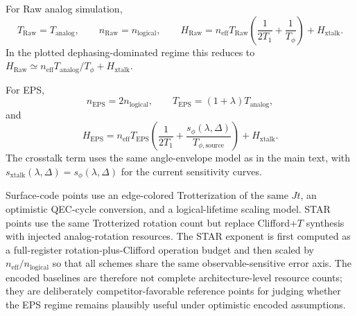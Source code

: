 For Raw analog simulation,
\begin{equation}
T_{\mathrm{Raw}}=T_{\mathrm{analog}},
\qquad
n_{\mathrm{Raw}}=n_{\mathrm{logical}},
\qquad
H_{\mathrm{Raw}}=
n_{\mathrm{eff}}T_{\mathrm{Raw}}
\left(\frac{1}{2T_1}+\frac{1}{T_\phi}\right)
+H_{\mathrm{xtalk}}.
\end{equation}
In the plotted dephasing-dominated regime this reduces to
\(H_{\mathrm{Raw}}\simeq n_{\mathrm{eff}}T_{\mathrm{analog}}/T_\phi
+H_{\mathrm{xtalk}}\).

For EPS,
\begin{equation}
n_{\mathrm{EPS}}=2n_{\mathrm{logical}},
\qquad
T_{\mathrm{EPS}}=(1+\lambda)T_{\mathrm{analog}},
\end{equation}
and
\begin{equation}
H_{\mathrm{EPS}}
=n_{\mathrm{eff}}T_{\mathrm{EPS}}
\left(\frac{1}{2T_1}
+\frac{s_\phi(\lambda,\Delta)}{T_{\phi,\mathrm{source}}}\right)
+H_{\mathrm{xtalk}}.
\end{equation}
The crosstalk term uses the same angle-envelope model as in the main text, with
\(s_{\mathrm{xtalk}}(\lambda,\Delta)=s_\phi(\lambda,\Delta)\) for the current
sensitivity curves.

Surface-code points use an edge-colored Trotterization of the same \(Jt\), an
optimistic QEC-cycle conversion, and a logical-lifetime scaling model. STAR
points use the same Trotterized rotation count but replace Clifford+\(T\)
synthesis with injected analog-rotation resources. The STAR exponent is first
computed as a full-register rotation-plus-Clifford operation budget and then
scaled by \(n_{\mathrm{eff}}/n_{\mathrm{logical}}\) so that all schemes share
the same observable-sensitive error axis. The encoded baselines are therefore
not complete architecture-level resource counts; they are deliberately
competitor-favorable reference points for judging whether the EPS regime remains
plausibly useful under optimistic encoded assumptions.
